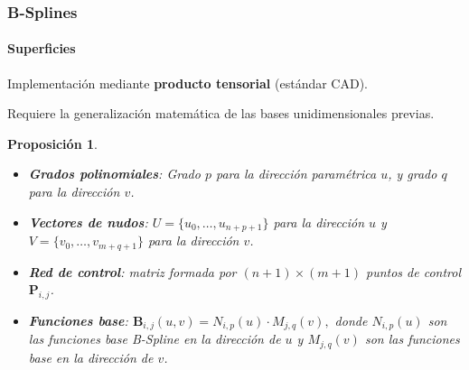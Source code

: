 \documentclass[compress]{beamer}
\newtheorem{proposition}[theorem]{Proposición}
\begin{document}

\begin{frame}
	\frametitle{B-Splines}
	\framesubtitle{Superficies} 
	\small
	Implementación mediante \textbf{producto tensorial} (estándar CAD).

	Requiere la generalización matemática de las bases unidimensionales previas.
	\begin{proposition}
		\begin{itemize}
			\item \textbf{Grados polinomiales}: Grado $p$ para la dirección paramétrica $u$, y grado $q$ para la dirección $v$.
			\item \textbf{Vectores de nudos}: $U = \{u_0, \dots, u_{n+p+1}\}$ para la dirección $u$ y $V = \{v_0, \dots, v_{m+q+1}\}$ para la dirección $v$.
			\item \textbf{Red de control}: matriz formada por $(n+1) \times (m+1)$ puntos de control $\mathbf{P}_{i,j}$.
			\item \textbf{Funciones base}: $\mathbf{B}_{i,j}(u, v) = N_{i,p}(u) \cdot M_{j,q}(v),$ donde  $N_{i,p}(u)$ son las funciones 
			base B-Spline en la dirección de $u$ y $M_{j,q}(v)$ son las funciones base en la dirección de $v$.
		\end{itemize}
	\end{proposition}
\end{frame}
\end{document}

